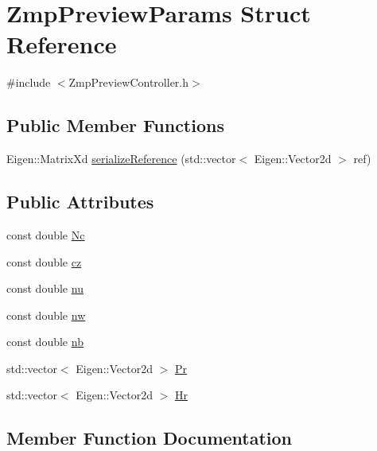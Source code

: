 \hypertarget{structZmpPreviewParams}{}\section{Zmp\+Preview\+Params Struct Reference}
\label{structZmpPreviewParams}


{\ttfamily \#include $<$Zmp\+Preview\+Controller.\+h$>$}

\subsection*{Public Member Functions}
\begin{DoxyCompactItemize}
\item 
Eigen\+::\+Matrix\+Xd \hyperlink{structZmpPreviewParams_aeeb0cf190cf77933cd819afb10888f07}{serialize\+Reference} (std\+::vector$<$ Eigen\+::\+Vector2d $>$ ref)
\end{DoxyCompactItemize}
\subsection*{Public Attributes}
\begin{DoxyCompactItemize}
\item 
const double \hyperlink{structZmpPreviewParams_aa2d2913f976860373f8f70abc13a22ba}{Nc}
\item 
const double \hyperlink{structZmpPreviewParams_a19d944dc7a6b40e6e55068a62d33e546}{cz}
\item 
const double \hyperlink{structZmpPreviewParams_a331ce39cf97a39d023ffd3c357d50e7a}{nu}
\item 
const double \hyperlink{structZmpPreviewParams_ae8e33a6d2e4d7d58444b9f38288831e4}{nw}
\item 
const double \hyperlink{structZmpPreviewParams_a906e4172573a97bcdaffa69548024a7e}{nb}
\item 
std\+::vector$<$ Eigen\+::\+Vector2d $>$ \hyperlink{structZmpPreviewParams_ae1a666259161913a15bf06832adcbf37}{Pr}
\item 
std\+::vector$<$ Eigen\+::\+Vector2d $>$ \hyperlink{structZmpPreviewParams_a5dc49bed0a434fd99f74517185792456}{Hr}
\end{DoxyCompactItemize}


\subsection{Member Function Documentation}
\hypertarget{structZmpPreviewParams_aeeb0cf190cf77933cd819afb10888f07}{}\label{structZmpPreviewParams_aeeb0cf190cf77933cd819afb10888f07} 
